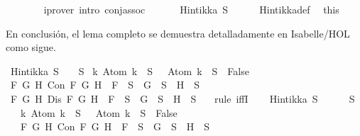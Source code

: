 \begin{isabellebody}
\ \ \ \ \ \ \isamarkupfalse%
\ {\isacharparenleft}iprover\ intro{\isacharcolon}\ conj{\isacharunderscore}assoc{\isacharparenright}\isanewline
\ \ \isamarkupfalse%
\isanewline
\ \ \isamarkupfalse%
\ {\isachardoublequoteopen}Hintikka\ S{\isachardoublequoteclose}\isanewline
\ \ \ \ \isamarkupfalse%
\ Hintikka{\isacharunderscore}def\ \isamarkupfalse%
\ this\isanewline
{}\isamarkupfalse%
%
\endisatagproof
{\isafoldproof}%
%
\isadelimproof
%
\endisadelimproof
%
\begin{isamarkuptext}%
En conclusión, el lema completo se demuestra detalladamente en Isabelle/HOL como sigue.%
\end{isamarkuptext}\isamarkuptrue%
\isamarkupfalse%
\ {\isachardoublequoteopen}Hintikka\ S\ {\isacharequal}\ {\isacharparenleft}{\isasymbottom}\ {\isasymnotin}\ S\isanewline
{\isasymand}\ {\isacharparenleft}{\isasymforall}k{\isachardot}\ Atom\ k\ {\isasymin}\ S\ {\isasymlongrightarrow}\ \isactrlbold {\isasymnot}\ {\isacharparenleft}Atom\ k{\isacharparenright}\ {\isasymin}\ S\ {\isasymlongrightarrow}\ False{\isacharparenright}\isanewline
{\isasymand}\ {\isacharparenleft}{\isasymforall}F\ G\ H{\isachardot}\ Con\ F\ G\ H\ {\isasymlongrightarrow}\ F\ {\isasymin}\ S\ {\isasymlongrightarrow}\ G\ {\isasymin}\ S\ {\isasymand}\ H\ {\isasymin}\ S{\isacharparenright}\isanewline
{\isasymand}\ {\isacharparenleft}{\isasymforall}F\ G\ H{\isachardot}\ Dis\ F\ G\ H\ {\isasymlongrightarrow}\ F\ {\isasymin}\ S\ {\isasymlongrightarrow}\ G\ {\isasymin}\ S\ {\isasymor}\ H\ {\isasymin}\ S{\isacharparenright}{\isacharparenright}{\isachardoublequoteclose}\ \ \isanewline
%
\isadelimproof
%
\endisadelimproof
%
\isatagproof
{}\isamarkupfalse%
\ {\isacharparenleft}rule\ iffI{\isacharparenright}\isanewline
\ \ \isamarkupfalse%
\ {\isachardoublequoteopen}Hintikka\ S{\isachardoublequoteclose}\isanewline
\ \ \isamarkupfalse%
\ {\isachardoublequoteopen}{\isacharparenleft}{\isasymbottom}\ {\isasymnotin}\ S\isanewline
\ \ {\isasymand}\ {\isacharparenleft}{\isasymforall}k{\isachardot}\ Atom\ k\ {\isasymin}\ S\ {\isasymlongrightarrow}\ \isactrlbold {\isasymnot}\ {\isacharparenleft}Atom\ k{\isacharparenright}\ {\isasymin}\ S\ {\isasymlongrightarrow}\ False{\isacharparenright}\isanewline
\ \ {\isasymand}\ {\isacharparenleft}{\isasymforall}F\ G\ H{\isachardot}\ Con\ F\ G\ H\ {\isasymlongrightarrow}\ F\ {\isasymin}\ S\ {\isasymlongrightarrow}\ G\ {\isasymin}\ S\ {\isasymand}\ H\ {\isasymin}\ S{\isacharparenright}\isanewline

\end{isabellebody}
